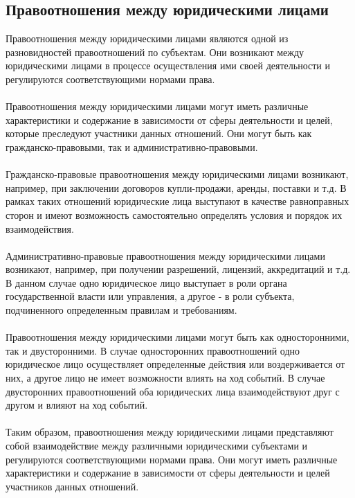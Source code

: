 \documentclass{article}
\begin{document}
\subsection{Правоотношения между юридическими лицами}
Правоотношения между юридическими лицами являются одной из разновидностей правоотношений по субъектам. Они возникают между юридическими лицами в процессе осуществления ими своей деятельности и регулируются соответствующими нормами права.\\
~\\
Правоотношения между юридическими лицами могут иметь различные характеристики и содержание в зависимости от сферы деятельности и целей, которые преследуют участники данных отношений. Они могут быть как гражданско-правовыми, так и административно-правовыми.\\
~\\
Гражданско-правовые правоотношения между юридическими лицами возникают, например, при заключении договоров купли-продажи, аренды, поставки и т.д. В рамках таких отношений юридические лица выступают в качестве равноправных сторон и имеют возможность самостоятельно определять условия и порядок их взаимодействия.\\
~\\
Административно-правовые правоотношения между юридическими лицами возникают, например, при получении разрешений, лицензий, аккредитаций и т.д. В данном случае одно юридическое лицо выступает в роли органа государственной власти или управления, а другое - в роли субъекта, подчиненного определенным правилам и требованиям.\\
~\\
Правоотношения между юридическими лицами могут быть как односторонними, так и двусторонними. В случае односторонних правоотношений одно юридическое лицо осуществляет определенные действия или воздерживается от них, а другое лицо не имеет возможности влиять на ход событий. В случае двусторонних правоотношений оба юридических лица взаимодействуют друг с другом и влияют на ход событий.\\
~\\
Таким образом, правоотношения между юридическими лицами представляют собой взаимодействие между различными юридическими субъектами и регулируются соответствующими нормами права. Они могут иметь различные характеристики и содержание в зависимости от сферы деятельности и целей участников данных отношений.\\
~\\

\newpage
\end{document}

